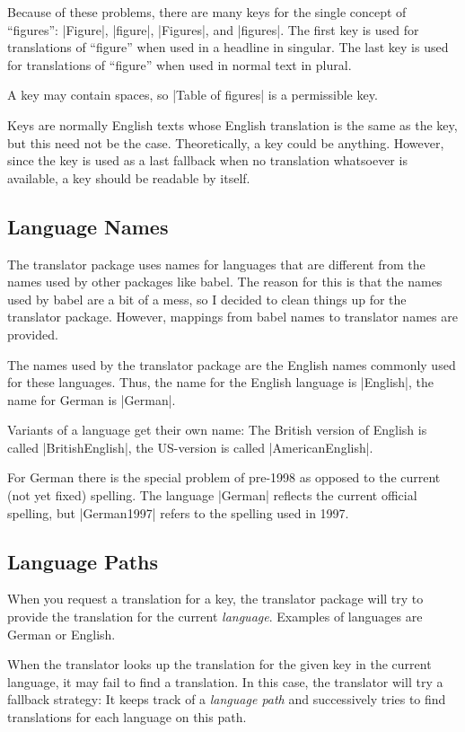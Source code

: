 \documentclass{ltxdoc}
\begin{document}
Because of these problems, there are many keys for the single concept
of ``figures'': |Figure|, |figure|, |Figures|, and |figures|. The
first key is used for translations of  ``figure'' when used
in a headline in singular. The last key is used for translations of
``figure'' when used in normal text in plural.

A key may contain spaces, so |Table of figures| is a permissible
key.

Keys are normally English texts whose English translation is the same
as the key, but this need not be the case. Theoretically, a key could
be anything. However, since the key is used as a last fallback when no
translation whatsoever is available, a key should be readable by itself.


\subsection{Language Names}

The translator package uses names for languages that are different
from the names used by other packages like babel. The reason for this
is that the names used by babel are a bit of a mess, so I decided to
clean things up for the translator package. However, mappings from
babel names to translator names are provided.

The names used by the translator package are the English names
commonly used for these languages. Thus, the name for the English
language is |English|, the name for German is |German|.

Variants of a language get their own name: The British version of
English is called |BritishEnglish|, the US-version is called
|AmericanEnglish|.

For German there is the special problem of pre-1998 as opposed to the
current (not yet fixed) spelling. The language |German| reflects the
current official spelling, but |German1997| refers to the spelling
used in 1997.


\subsection{Language Paths}

When you request a translation for a key, the translator package will
try to provide the translation for the current
\emph{language}. Examples of languages are German or English.

When the translator looks up the translation for the given key in the
current language, it may fail to find a translation. In this case, the
translator will try a fallback strategy: It keeps track of a
\emph{language path} and successively tries to find translations for
each language on this path.
\end{document}
